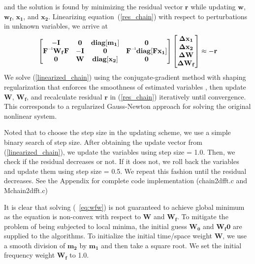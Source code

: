 and the solution is found by minimizing the residual vector $\mathbf{r}$ while updating $\mathbf{w}$, $\mathbf{w_f}$, $\mathbf{x_1}$, and $\mathbf{x_2}$. Linearizing equation~(\ref{res_chain}) with respect to perturbations in unknown variables, we arrive at
\begin{equation}
\begin{bmatrix}
\mathbf{-I} & \mathbf{0} & \mathbf{diag[m_1]} & \mathbf{0}\\
\mathbf{\inv{F}W_{f}F} & \mathbf{-I} & \mathbf{0} & \mathbf{\inv{F}diag[Fx_1]}\\
\mathbf{0} & \mathbf{W} & \mathbf{diag[x_2]}  & \mathbf{0}
\end{bmatrix}
\begin{bmatrix}
\mathbf{\Delta x_1} \\
\mathbf{\Delta x_2} \\
\mathbf{\Delta W} \\
\mathbf{\Delta W_f}
\end{bmatrix}
\approx \mathbf{-r} 
\label{linearized_chain}
\end{equation}
We solve (\ref{linearized_chain}) using the conjugate-gradient method with shaping regularization that enforces the smoothness of estimated variables \cite[]{shaping}, then update $\mathbf{W}$, $\mathbf{W_f}$, and recalculate residual $\mathbf{r}$ in (\ref{res_chain}) iteratively until  convergence. This corresponds to a regularized Gauss-Newton approach for solving the original nonlinear system. 

Noted that to choose the step size in the updating scheme, we use a simple binary search of step size. After obtaining the update vector from (\ref{linearized_chain}), we update the variables using step size = 1.0. Then, we check if the residual decreases or not. If it does not, we roll back the variables and update them using step size = 0.5. We repeat this fashion until the residual decreases. See the Appendix for complete code implementation (chain2dfft.c and Mchain2dfft.c)


It is clear that solving (~\ref{eq:wfw}) is not guaranteed to achieve global minimum as the equation is non-convex with respect to $\mathbf{W}$ and $\mathbf{W_f}$. To mitigate the problem of being subjected to local minima, the initial guess $\mathbf{W_0}$ and $\mathbf{W_f0}$ are supplied to the algorithms. To initialize the initial time/space weight $\mathbf{W}$, we use a smooth division of $\mathbf{m_2}$ by $\mathbf{m_1}$ \cite[]{local} and then take a square root. We set the initial frequency weight $\mathbf{W_f}$ to 1.0.


